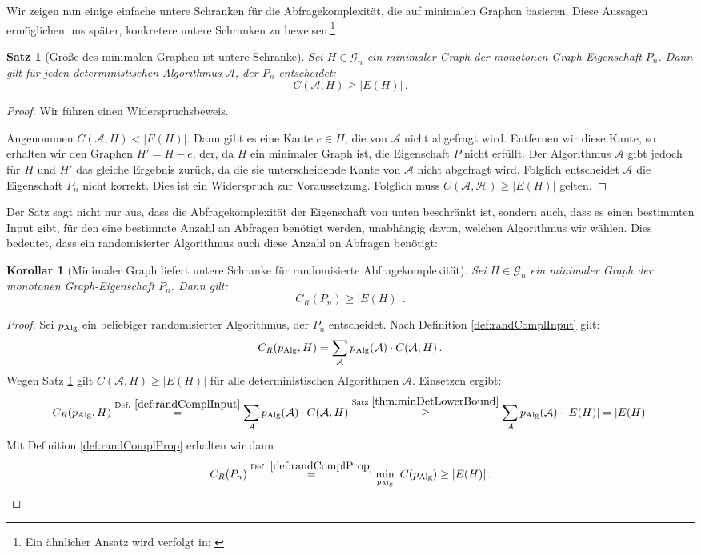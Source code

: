 \documentclass[10pt,a4paper, footheight=1mm, bibliography=totoc]{scrreprt}
\newtheorem{Satz}[definition]{Satz}
\newtheorem{corollary}[definition]{Korollar}
\theoremstyle{definition}
\begin{document}
Wir zeigen nun einige einfache untere Schranken
für die Abfragekomplexität, die auf minimalen
Graphen basieren. Diese Aussagen ermöglichen uns
später, konkretere untere Schranken zu beweisen.\footnote{
Ein ähnlicher Ansatz wird verfolgt in: \cite{Groeger}}
\begin{Satz}[Größe des minimalen Graphen ist untere Schranke]
\label{thm:minDetLowerBound}
Sei $H\in \mathcal{G}_n$ ein minimaler Graph der monotonen
Graph-Eigenschaft $P_n$. Dann gilt für jeden deterministischen
Algorithmus $\mathcal{A}$, der $P_n$ entscheidet:
$$ C(\mathcal{A},H) \geq |E(H)|\,.$$
\end{Satz}
\begin{proof}
Wir führen einen Widerspruchsbeweis.

Angenommen $ C(\mathcal{A},H) < |E(H)| $.
Dann gibt es eine Kante $e\in H$,
die von $\mathcal{A}$ nicht abgefragt wird. Entfernen wir
diese Kante, so erhalten wir den Graphen $H' = H - e$, der,
da $H$ ein minimaler Graph ist, die Eigenschaft $P$ nicht
erfüllt. Der Algorithmus $\mathcal{A}$ gibt jedoch für $H$ und $H'$ das gleiche
Ergebnis zurück, da die sie unterscheidende Kante von $\mathcal{A}$
nicht abgefragt wird. Folglich entscheidet $\mathcal{A}$ die
Eigenschaft $P_n$ nicht korrekt. Dies ist ein Widerspruch zur
Voraussetzung. Folglich muss $ C(\mathcal{A,H}) \geq |E(H)| $ gelten. 
\end{proof}
Der Satz sagt nicht nur aus, dass die Abfragekomplexität
der Eigenschaft von unten beschränkt ist, sondern auch, dass
es einen bestimmten Input gibt, für den eine bestimmte Anzahl
an Abfragen benötigt werden, unabhängig davon, welchen Algorithmus
wir wählen. Dies bedeutet, dass ein randomisierter Algorithmus
auch diese Anzahl an Abfragen benötigt:
\begin{corollary}[Minimaler Graph liefert untere Schranke für 
                  randomisierte Abfragekomplexität]
\label{cor:MinGraphRandCompl}
Sei $H\in \mathcal{G}_n$ ein minimaler Graph der monotonen
Graph-Eigenschaft $P_n$. Dann gilt:
$$C_R(P_n) \geq |E(H)|\,.$$
\end{corollary}
\begin{proof}
Sei $p_\textup{Alg}$ ein beliebiger randomisierter Algorithmus,
der $P_n$ entscheidet.
Nach Definition \ref{def:randComplInput} gilt: 
$$ C_R(p_\textup{Alg}, H) = 
\sum_\mathcal{A} p_\textup{Alg}(\mathcal{A}) \cdot C(\mathcal{A}, H)\,.$$
Wegen Satz \ref{thm:minDetLowerBound} gilt $C(\mathcal{A}, H) \geq |E(H)|$
für alle deterministischen Algorithmen $\mathcal{A}$. Einsetzen ergibt:
$$ C_R(p_\textup{Alg}, H) \overset{\textup{Def. } \ref{def:randComplInput}} {=}
\sum_\mathcal{A} p_\textup{Alg}(\mathcal{A}) \cdot C(\mathcal{A}, H) 
\overset{\textup{Satz } \ref{thm:minDetLowerBound}} {\geq}
\sum_\mathcal{A} p_\textup{Alg}(\mathcal{A}) \cdot |E(H)| =
|E(H)| $$
Mit Definition \ref{def:randComplProp} erhalten wir dann
\begin{equation*}
C_R(P_n) \overset{\textup{Def. } \ref{def:randComplProp}} {=} 
\min_{p_\textup{Alg}}\ C(p_\textup{Alg}) \geq |E(H)|\,. \qedhere
\end{equation*}
\end{proof}
\end{document}
